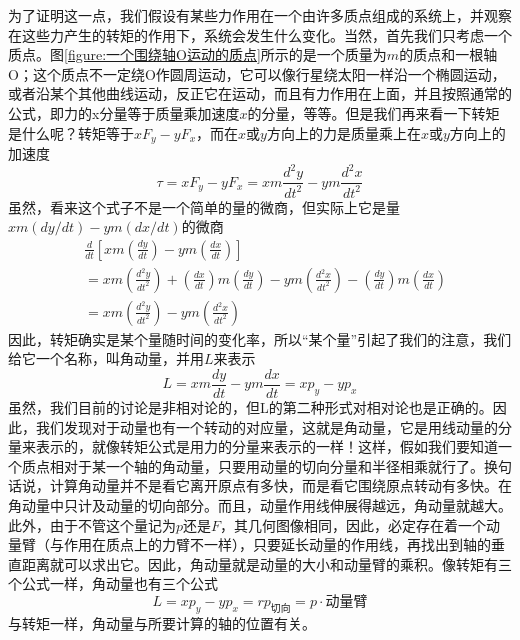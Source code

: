 为了证明这一点，我们假设有某些力作用在一个由许多质点组成的系统上，并观察在这些力产生的转矩的作用下，系统会发生什么变化。当然，首先我们只考虑一个质点。图\ref{figure:一个围绕轴O运动的质点}所示的是一个质量为$m$的质点和一根轴O；这个质点不一定绕O作圆周运动，它可以像行星绕太阳一样沿一个椭圆运动，或者沿某个其他曲线运动，反正它在运动，而且有力作用在上面，并且按照通常的公式，即力的x分量等于质量乘加速度$x$的分量，等等。但是我们再来看一下转矩是什么呢？转矩等于$xF_y-yF_x$，而在$x$或$y$方向上的力是质量乘上在$x$或$y$方向上的加速度
\begin{equation}
    \label{Eq:I:18:14}
    \tau = xF_y-yF_x = xm\frac{d^2y}{dt^2} - ym\frac{d^2x}{dt^2}
\end{equation}
虽然，看来这个式子不是一个简单的量的微商，但实际上它是量$xm(dy/dt)-ym(dx/dt)$的微商
\begin{equation}
    \label{Eq:I:18:15}
    \begin{aligned}
        & \frac{d}{dt}\left [xm\left (\frac{dy}{dt}\right ) - ym\left (\frac{dx}{dt}\right )\right ] \\
        &= xm\left (\frac{d^2y}{dt^2}\right ) + \left (\frac{dx}{dt}\right )m\left (\frac{dy}{dt}\right ) - ym\left (\frac{d^2x}{dt^2}\right ) - \left (\frac{dy}{dt}\right )m\left (\frac{dx}{dt}\right ) \\
        &= xm\left (\frac{d^2y}{dt^2}\right ) - ym\left (\frac{d^2x}{dt^2}\right )
    \end{aligned}
\end{equation}
因此，转矩确实是某个量随时间的变化率，所以“某个量”引起了我们的注意，我们给它一个名称，叫角动量，并用$L$来表示
\begin{equation}
    \label{Eq:I:18:16}
    L = xm\frac{dy}{dt} - ym\frac{dx}{dt} = xp_y - yp_x
\end{equation}
虽然，我们目前的讨论是非相对论的，但L的第二种形式对相对论也是正确的。因此，我们发现对于动量也有一个转动的对应量，这就是角动量，它是用线动量的分量来表示的，就像转矩公式是用力的分量来表示的一样！这样，假如我们要知道一个质点相对于某一个轴的角动量，只要用动量的切向分量和半径相乘就行了。换句话说，计算角动量并不是看它离开原点有多快，而是看它围绕原点转动有多快。在角动量中只计及动量的切向部分。而且，动量作用线伸展得越远，角动量就越大。此外，由于不管这个量记为$p$还是$F$，其几何图像相同，因此，必定存在着一个动量臂（与作用在质点上的力臂不一样），只要延长动量的作用线，再找出到轴的垂直距离就可以求出它。因此，角动量就是动量的大小和动量臂的乘积。像转矩有三个公式一样，角动量也有三个公式
\begin{equation}
    \label{Eq:I:18:17}
    L= xp_y - yp_x = rp_\text{切向} = p \cdot \text{动量臂}
\end{equation}
与转矩一样，角动量与所要计算的轴的位置有关。

